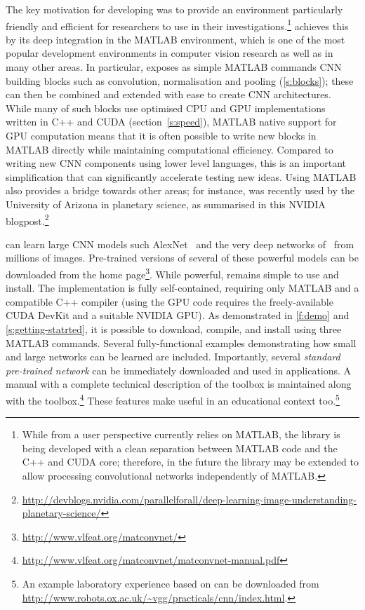 The key motivation for developing \matconvnet was to provide an environment particularly friendly and efficient for researchers to use in their investigations.\footnote{While from a user perspective \matconvnet currently relies on MATLAB, the library is being developed with a clean separation between MATLAB code and the C++ and CUDA core; therefore, in the future the library may be extended to allow processing convolutional networks independently of MATLAB.} \matconvnet achieves this by its deep integration in the MATLAB environment, which is one of the most popular development environments in computer vision research as well as in many other areas. In particular, \matconvnet exposes as simple MATLAB commands CNN building blocks such as convolution, normalisation and pooling (\cref{s:blocks}); these can then be combined and extended with ease to create CNN architectures. While many of such blocks use optimised CPU and GPU implementations written in C++ and CUDA (section~\cref{s:speed}), MATLAB native support for GPU computation means that it is often possible to write new blocks in MATLAB directly while maintaining computational efficiency. Compared to writing new CNN components using lower level languages, this is an important simplification that can significantly accelerate testing new ideas. Using MATLAB also provides a bridge towards other areas; for instance, \matconvnet was recently used by the University of Arizona in planetary science, as summarised in this NVIDIA blogpost.\footnote{\small\url{http://devblogs.nvidia.com/parallelforall/deep-learning-image-understanding-planetary-science/}}

\matconvnet can learn large CNN models such AlexNet~\cite{krizhevsky12imagenet} and the very deep networks of~\cite{simonyan14deep} from millions of images. Pre-trained versions of several of these powerful models can be downloaded from  the \matconvnet home page\footnote{\small\url{http://www.vlfeat.org/matconvnet/}}. While powerful, \matconvnet remains simple to use and install. The implementation is fully self-contained, requiring only MATLAB and a compatible C++ compiler (using the GPU code requires the freely-available CUDA DevKit and a suitable NVIDIA GPU). As demonstrated in \cref{f:demo} and \cref{s:getting-statrted}, it is possible to download, compile, and install \matconvnet using three MATLAB commands. Several fully-functional examples demonstrating how small and large networks can be learned are included. Importantly, several \emph{standard pre-trained network} can be immediately downloaded and used in applications. A manual with a complete technical description of the toolbox is maintained along with the toolbox.\footnote{\small\url{http://www.vlfeat.org/matconvnet/matconvnet-manual.pdf}} These features make \matconvnet useful in an educational context too.\footnote{An example laboratory experience based on \matconvnet can be downloaded from {\small\url{http://www.robots.ox.ac.uk/~vgg/practicals/cnn/index.html}}.}

